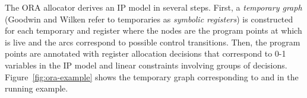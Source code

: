 \documentclass[acmsmall,authorversion,nonacm]{acmart}
\newcommand{\noMathVar}[2]{\operatorname{#1}(#2)}
\begin{document}
The ORA allocator derives an IP model in several steps.
First, a \emph{temporary graph} (Goodwin and Wilken refer to
temporaries as \emph{symbolic registers}) is constructed for each
temporary  and register  where the nodes are the program points
 at which  is live and the arcs correspond
to possible control transitions.
Then, the program points are annotated with register allocation
decisions that correspond to \mbox{0-1} variables in the IP model and
linear constraints involving groups of decisions.
Figure~\ref{fig:ora-example} shows the temporary graph corresponding
to  and  in the running example.

\newcommand{\defvar}[1]{\noMathVar{def}{\Temp{1},\register{R1},#1}}
\newcommand{\storevar}[1]{\noMathVar{store}{\Temp{1},\register{R1},#1}}
\newcommand{\contvar}[1]{\noMathVar{cont}{\Temp{1},\register{R1},#1}}
\newcommand{\loadvar}[1]{\noMathVar{load}{\Temp{1},\register{R1},#1}}
\newcommand{\useendvar}[1]{\noMathVar{use-end}{\Temp{1},\register{R1},#1}}
\newcommand{\usecontvar}[1]{\noMathVar{use-cont}{\Temp{1},\register{R1},#1}}
\end{document}

